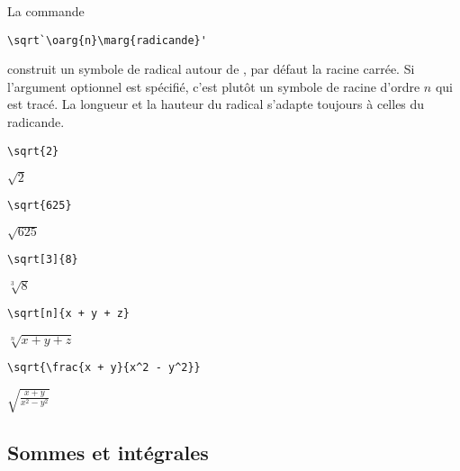 La commande
\begin{lstlisting}
\sqrt`\oarg{n}\marg{radicande}'
\end{lstlisting}
construit un symbole de radical autour de , par défaut
la racine carrée. Si l'argument optionnel  est spécifié, c'est
plutôt un symbole de racine d'ordre $n$ qui est tracé. La longueur et
la hauteur du radical s'adapte toujours à celles du radicande.
\begin{demo}
  \begin{minipage}{0.3\linewidth}
    \begin{texample}[0.6\linewidth]
\begin{lstlisting}
\sqrt{2}
\end{lstlisting}
      \producing $\sqrt{2}$
    \end{texample}
  \end{minipage}
  \quad
  \begin{minipage}{0.3\linewidth}
    \begin{texample}[0.6\linewidth]
\begin{lstlisting}
\sqrt{625}
\end{lstlisting}
      \producing
      $\sqrt{625}$
    \end{texample}
  \end{minipage}
  \quad
  \begin{minipage}{0.3\linewidth}
    \begin{texample}[0.6\linewidth]
\begin{lstlisting}
\sqrt[3]{8}
\end{lstlisting}
      \producing
      $\sqrt[3]{8}$
    \end{texample}
  \end{minipage}

  \begin{texample}
\begin{lstlisting}
\sqrt[n]{x + y + z}
\end{lstlisting}
    \producing
    $\sqrt[n]{x + y + z}$
  \end{texample}

  \begin{texample}
\begin{lstlisting}
\sqrt{\frac{x + y}{x^2 - y^2}}
\end{lstlisting}
    \producing
    $\displaystyle \sqrt{\frac{x + y}{x^2 - y^2}}$
  \end{texample}
\end{demo}

\subsection{Sommes et intégrales}
\label{sec:math:bases:sommes-et-integrales}

